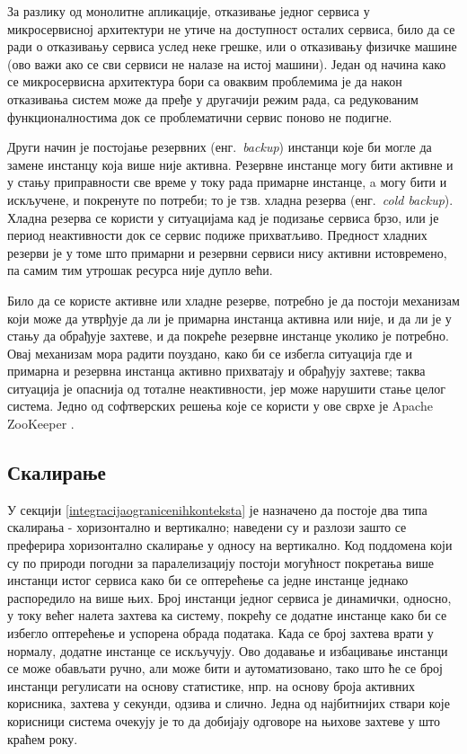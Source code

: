 \documentclass[12pt,oneside]{memoir}
\begin{document}
За разлику од монолитне апликације, отказивање једног сервиса у микросервисној архитектури не утиче на доступност осталих сервиса, било да се ради о отказивању сервиса услед неке грешке, или о отказивању физичке машине (ово важи ако се сви сервиси не налазе на истој машини). Један од начина како се микросервисна архитектура бори са оваквим проблемима је да након отказивања систем може да пређе у другачији режим рада, са редукованим функционалностима док се проблематични сервис поново не подигне.

Други начин је постојање резервних (енг.~\textit{backup}) инстанци које би могле да замене инстанцу која више није активна. Резервне инстанце могу бити активне и у стању приправности све време у току рада примарне инстанце, a могу бити и искључене, и покренуте по потреби; то је тзв. хладна резерва (енг.~\textit{cold backup}). Хладна резерва се користи у ситуацијама кад је подизање сервиса брзо, или је период неактивности док се сервис подиже прихватљиво. Предност хладних резерви је у томе што примарни и резервни сервиси нису активни истовремено, па самим тим утрошак ресурса није дупло већи.

Било да се користе активне или хладне резерве, потребно је да постоји механизам који може да утврђује да ли је примарна инстанца активна или није, и да ли је у стању да обрађује захтеве, и да покреће резервне инстанце уколико је потребно. Овај механизам мора радити поуздано, како би се избегла ситуација где и примарна и резервна инстанца активно прихватају и обрађују захтеве; таква ситуација је опаснија од тоталне неактивности, јер може нарушити стање целог система. Једно од софтверских решења које се користи у ове сврхе је Apache ZooKeeper \cite{Zookeeper}.

\subsection{Скалирање}
У секцији \ref{integracijaogranicenihkonteksta} је назначено да постоје два типа скалирања - хоризонтално и вертикално; наведени су и разлози зашто се преферира хоризонтално скалирање у односу на вертикално. Код поддомена који су по природи погодни за паралелизацију постоји могућност покретања више инстанци истог сервиса како би се оптерећење са једне инстанце једнако распоредило на више њих. Број инстанци једног сервиса је динамички, односно, у току већег налета захтева ка систему, покрећу се додатне инстанце како би се избегло оптерећење и успорена обрада података. Када се број захтева врати у нормалу, додатне инстанце се искључују. Ово додавање и избацивање инстанци се може обављати ручно, али може бити и аутоматизовано, тако што ће се број инстанци регулисати на основу статистике, нпр. на основу броја активних корисника, захтева у секунди, одзива и слично. Једна од најбитнијих ствари које корисници система очекују је то да добијају одговоре на њихове захтеве у што краћем року.
\end{document}
